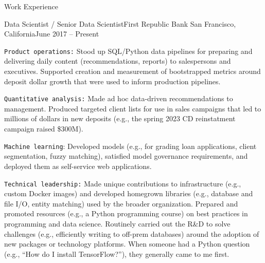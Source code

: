 \documentclass{article}
\newlength{\tabin}
\newlength{\secsep}
\newcommand{\lineunder}{\vspace*{-8pt} \\ \hspace*{-6pt} \hrulefill \\ \vspace*{-15pt}}
\newenvironment{tabbedsection}[1]{
  \begin{list}{}{
      \setlength{\itemsep}{0pt}
      \setlength{\labelsep}{0pt}
      \setlength{\labelwidth}{0pt}
      \setlength{\leftmargin}{\tabin}
      \setlength{\rightmargin}{\tabin}
      \setlength{\listparindent}{0pt}
      \setlength{\parsep}{0pt}
      \setlength{\parskip}{0pt}
      \setlength{\partopsep}{0pt}
      \setlength{\topsep}{#1}
    }
  \item[]
}{\end{list}}
\newenvironment{resume_section}[1]{
  \filbreak
  \vspace{2\secsep}
  \textsc{\large#1}
  \lineunder
  \begin{tabbedsection}{\secsep}
}{\end{tabbedsection}}
\newenvironment{subitems}{
  \renewcommand{\labelitemi}{-}
  \begin{itemize}
      \setlength{\labelsep}{1em}
}{\end{itemize}}
\newenvironment{resume_employer}[4]{
  \vspace{\secsep}
  \textbf{#1} \\ 
  \indent {\small #2} \hfill {\footnotesize#3 (#4)}
  \begin{tabbedsection}{0pt}
  \begin{subitems}
}{\end{subitems}\end{tabbedsection}}
\begin{document}
\begin{resume_section}{Work Experience}

  \begin{resume_employer}{Data Scientist / Senior Data Scientist}{First Republic Bank}
  {San Francisco, California}{June 2017 -- Present}


    \item \texttt{Product operations:} Stood up SQL/Python data pipelines for preparing and delivering daily content (recommendations, reports) to salespersons and executives. Supported creation and measurement of bootstrapped metrics around deposit dollar growth that were used to inform production pipelines.
    \item \texttt{Quantitative analysis:} Made ad hoc data-driven recommendations to management. Produced targeted client lists for use in sales campaigns that led to millions of dollars in new deposits (e.g., the spring 2023 CD reinstatment campaign raised \$300M).
    \item \texttt{Machine learning}: Developed models (e.g., for grading loan applications, client segmentation, fuzzy matching), satisfied model governance requirements, and deployed them as self-service web applications.
    \item \texttt{Technical leadership:} Made unique contributions to infrastructure (e.g., custom Docker images) and developed homegrown libraries (e.g., database and file I/O, entity matching) used by the broader organization. Prepared and promoted resources (e.g., a Python programming course) on best practices in programming and data science. Routinely carried out the R\&D to solve challenges (e.g., efficiently writing to off-prem databases) around the adoption of new packages or technology platforms. When someone had a Python question (e.g., ``How do I install TensorFlow?''), they generally came to me first.




\end{resume_employer}
\end{resume_section}
\end{document}
